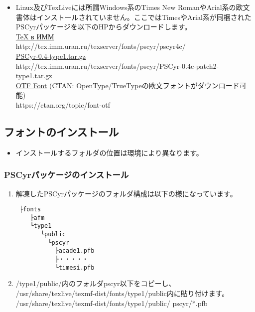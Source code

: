 \documentclass[a4paper,10pt]{ltjsarticle}
\def\colH#1{\color[HTML]{#1}}
\def\fs#1{\fontsize{#1}{#1}\selectfont }
\begin{document}
\begin{itemize} 
  \item Linux及びTexLiveには所謂Windows系のTimes New RomanやArial系の欧文書体はインストールされていません。ここではTimesやArial系が同梱されたPSCyrパッケージを以下のHPからダウンロードします。\\ 
  \href{http://tex.imm.uran.ru/texserver/fonts/pscyr/pscyr4c/}{TeX в ИММ}\\
  {\fs{11}http://tex.imm.uran.ru/texserver/fonts/pscyr/pscyr4c/}\\  
  \href{http://tex.imm.uran.ru/texserver/fonts/pscyr/PSCyr-0.4c-patch2-type1.tar.gz}{PSCyr-0.4-type1.tar.gz}\\
  {\fs{11}http://tex.imm.uran.ru/texserver/fonts/pscyr/PSCyr-0.4c-patch2-type1.tar.gz}\\
\href{https://ctan.org/topic/font-otf}{OTF Font} (CTAN: OpenType/TrueTypeの欧文フォントがダウンロード可能)\\
https://ctan.org/topic/font-otf
\end{itemize}
\vspace{-2mm}

\subsection{フォントのインストール}
\begin{itemize}
  \item インストールするフォルダの位置は環境により異なります。\vspace{-6mm}
\end{itemize}

\subsubsection{PSCyrパッケージのインストール}

\vspace{2mm}

\begin{enumerate}
  \item 解凍したPSCyrパッケージのフォルダ構成は以下の様になっています。
{\fs{10pt}
\begin{verbatim}
 ├fonts
    ├afm
    └type1
       └public
         └pscyr
           ├acade1.pfb
           ├・・・・・
           └timesi.pfb
\end{verbatim}
}

  \item /type1/public/内のフォルダpscyr以下をコピーし、\\
  /usr/share/texlive/texmf-dist/fonts/type1/public内に貼り付けます。\\
/usr/share/texlive/texmf-dist/fonts/type1/public/{\colH{800000} pscyr/*.pfb}
\end{enumerate}
\vspace{-8mm}
\end{document}

